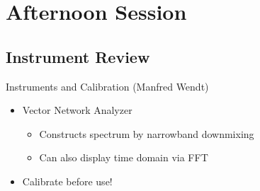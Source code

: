 \documentclass{beamer}
\begin{document}
\section{Afternoon Session}
\subsection{Instrument Review}
\begin{frame}[t,fragile]{Instruments and Calibration (Manfred Wendt)}
\begin{figure}
  \centering\setcounter{subfigure}{0}
  \;
\end{figure}
\begin{itemize}
\item Vector Network Analyzer
\begin{itemize}
\item Constructs spectrum by narrowband downmixing
\item Can also display time domain via FFT
\end{itemize}
\item Calibrate before use!
\end{itemize}
\end{frame}
\end{document}
